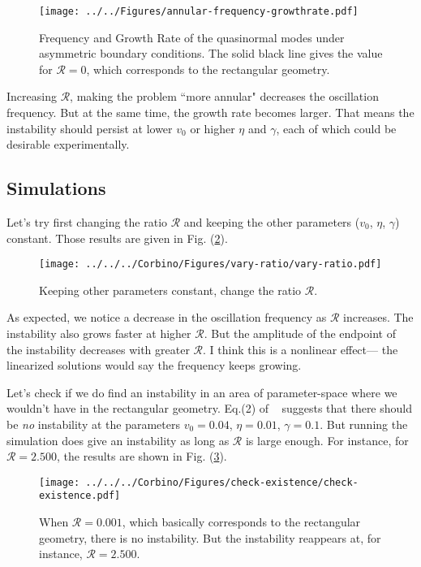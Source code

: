 \documentclass[12pt]{article}
\begin{document}
	\begin{figure}[ht]
		\centering
		\texttt{[image: ../../Figures/annular-frequency-growthrate.pdf]}
		\caption{Frequency and Growth Rate of the quasinormal modes under asymmetric boundary conditions.  The solid black line gives the value for $\mathcal{R}=0$, which corresponds to the rectangular geometry.}\label{fig:symmetricFrequencies}
	\end{figure}

	Increasing $\mathcal{R}$, making the problem ``more annular" decreases the oscillation frequency.  But at the same time, the growth rate becomes larger.  That means the instability should persist at lower $v_0$ or higher $\eta$ and $\gamma$, each of which could be desirable experimentally.
	
	\subsection{Simulations}
	Let's try first changing the ratio $\mathcal{R}$ and keeping the other parameters ($v_0$, $\eta$, $\gamma$) constant.  Those results are given in Fig. (\ref{fig:vary-ratio}).
	
	\begin{figure}[ht]
		\centering
		\texttt{[image: ../../../Corbino/Figures/vary-ratio/vary-ratio.pdf]}
		\caption{Keeping other parameters constant, change the ratio $\mathcal{R}$.}\label{fig:vary-ratio}
	\end{figure}
	
	As expected, we notice a decrease in the oscillation frequency as $\mathcal{R}$ increases.  The instability also grows faster at higher $\mathcal{R}$.  But the amplitude of the endpoint of the instability decreases with greater $\mathcal{R}$.  I think this is a nonlinear effect--- the linearized solutions would say the frequency keeps growing. 
	
	Let's check if we do find an instability in an area of parameter-space where we wouldn't have in the rectangular geometry.  Eq.(2) of ~\cite{Mendl2019} suggests that there should be \textit{no} instability at the parameters $v_0 = 0.04$, $\eta=0.01$, $\gamma=0.1$.  But running the simulation does give an instability as long as $\mathcal{R}$ is large enough.  For instance, for $\mathcal{R}=2.500$, the results are shown in Fig. (\ref{fig:check-existence}).
	
	\begin{figure}[ht]
		\centering
		\texttt{[image: ../../../Corbino/Figures/check-existence/check-existence.pdf]}
		\caption{When $\mathcal{R}=0.001$, which basically corresponds to the rectangular geometry, there is no instability.  But the instability reappears at, for instance, $\mathcal{R}=2.500$.}\label{fig:check-existence}
	\end{figure}
	
\end{document}
